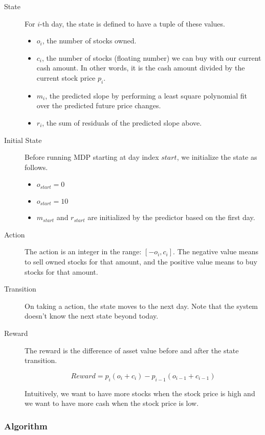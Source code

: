 \documentclass[twocolumn,10pt]{asme2ej}
\begin{document}
\begin{description}
\item[State] For $i$-th day, the state is defined to have a tuple of
  these values.
  \begin{itemize}
  \item $o_i$, the number of stocks owned.
  \item $c_i$, the number of stocks (floating number) we can buy with
    our current cash amount. In other words, it is the cash amount
    divided by the current stock price $p_i$.
    \item $m_i$, the predicted slope by performing a least square
      polynomial fit over the predicted future price changes.
    \item $r_i$, the sum of residuals of the predicted slope
      above.
  \end{itemize}

\item[Initial State] Before running MDP starting at day index $start$,
  we initialize the state as follows.
  \begin{itemize}
  \item $o_{start} = 0$
  \item $o_{start} = 10$
  \item $m_{start}$ and $r_{start}$ are initialized by the predictor based
    on the first day.
  \end{itemize}
  
\item[Action] The action is an integer in the range: $[-o_i,c_i]$. The
  negative value means to sell owned stocks for that amount, and the
  positive value means to buy stocks for that amount.

\item[Transition] On taking a action, the state moves to the next
  day. Note that the system doesn't know the next state beyond today.

\item[Reward] The reward is the difference of asset value before and
  after the state transition. 
  
  \[
  Reward = p_i(o_{i} + c_{i}) - p_{i-1}(o_{i-1} + c_{i-1})
  \]
  
  Intuitively, we want to have more stocks when the stock price is
  high and we want to have more cash when the stock price is low.
\end{description}

\subsubsection{Algorithm}
\end{document}
